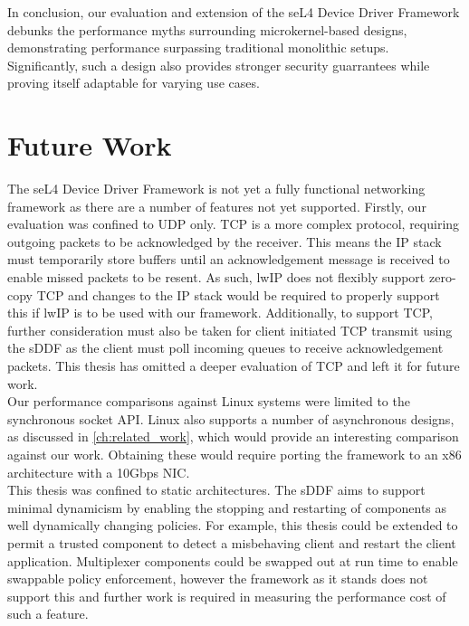 In conclusion, our evaluation and extension of the seL4 Device Driver Framework debunks
the performance myths surrounding microkernel-based designs, demonstrating performance surpassing traditional
monolithic setups. Significantly, such a design also provides stronger security guarrantees while proving itself 
adaptable for varying use cases.

\section{Future Work}

The seL4 Device Driver Framework is not yet a fully functional networking framework as there are a number of features
not yet supported.
Firstly, our evaluation was confined to UDP only. TCP is a more complex protocol, requiring outgoing packets to be acknowledged 
by the receiver. This means the IP stack must temporarily store buffers until an acknowledgement message is received to enable missed packets 
to be resent. As such, lwIP does not flexibly support zero-copy TCP and changes to the IP stack would be required to properly
support this if lwIP is to be used with our framework. Additionally, to support TCP, further consideration must also be taken
for client initiated TCP transmit using the sDDF as the client must poll incoming queues to receive acknowledgement packets. 
This thesis has omitted a deeper evaluation of TCP and left it for future work. \\

Our performance comparisons against Linux systems were limited to the synchronous socket API. Linux also supports a number
of asynchronous designs, as discussed in \autoref{ch:related_work}, which would provide an interesting comparison against 
our work. Obtaining these would require porting the framework to an x86 architecture with a 10Gbps NIC. \\

This thesis was confined to static architectures. The sDDF aims to support minimal dynamicism by enabling the stopping and restarting
of components as well dynamically changing policies. For example, this thesis could be extended to permit a trusted component
to detect a misbehaving client and restart the client application. Multiplexer components could be swapped out at run time to enable
swappable policy enforcement, however the framework as it stands does not support this and further work is required in measuring 
the performance cost of such a feature. \\

